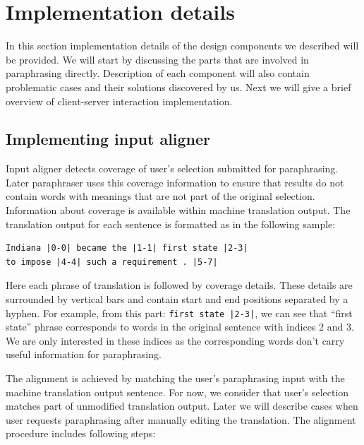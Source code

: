 \section{Implementation details}

In this section implementation details of the design components we described will be provided. We will start by discussing the parts that are involved in paraphrasing directly. Description of each component will also contain problematic cases and their solutions discovered by us. Next we will give a brief overview of client-server interaction implementation.

\subsection{Implementing input aligner}

Input aligner detects coverage of user's selection submitted for paraphrasing. Later paraphraser uses this coverage information to ensure that results do not contain words with meanings that are not part of the original selection. Information about coverage is available within machine translation output. The translation output for each sentence is formatted as in the following sample:

\begin{verbatim}
Indiana |0-0| became the |1-1| first state |2-3| 
to impose |4-4| such a requirement . |5-7|
\end{verbatim}

Here each phrase of translation is followed by coverage details. These details are surrounded by vertical bars and contain start and end positions separated by a hyphen. For example, from this part: \texttt{first state |2-3|}, we can see that ``first state'' phrase corresponds to words in the original sentence with indices 2 and 3. We are only interested in these indices as the corresponding words don't carry useful information for paraphrasing.

The alignment is achieved by matching the user's paraphrasing input with the machine translation output sentence. For now, we consider that user's selection matches part of unmodified translation output. Later we will describe cases when user  requests paraphrasing after manually editing the translation. The alignment procedure includes following steps:

